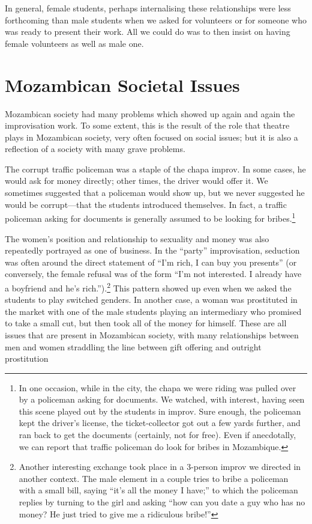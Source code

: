 \documentclass[article,twocolumn,twoside]{memoir}
\begin{document}
In general, female students, perhaps internalising these relationships were
less forthcoming than male students when we asked for volunteers or for someone
who was ready to present their work. All we could do was to then insist on
having female volunteers as well as male one.

\section{Mozambican Societal Issues}

Mozambican society had many problems which showed up again and again the
improvisation work. To some extent, this is the result of the role that theatre
plays in Mozambican society, very often focused on social issues; but it is
also a reflection of a society with many grave problems.

The corrupt traffic policeman was a staple of the chapa improv. In some cases,
he would ask for money directly; other times, the driver would offer it. We
sometimes suggested that a policeman would show up, but we never suggested he
would be corrupt---that the students introduced themselves. In fact, a traffic
policeman asking for documents is generally assumed to be looking for
bribes.\footnote{In one occasion, while in the city, the chapa we were riding
was pulled over by a policeman asking for documents. We watched, with interest,
having seen this scene played out by the students in improv. Sure enough, the
policeman kept the driver's license, the ticket-collector got out a few yards
further, and ran back to get the documents (certainly, not for free). Even if
anecdotally, we can report that traffic policeman do look for bribes in
Mozambique.}

The women's position and relationship to sexuality and money was also
repeatedly portrayed as one of business. In the ``party'' improvisation,
seduction was often around the direct statement of ``I'm rich, I can buy you
presents'' (or conversely, the female refusal was of the form ``I'm not
interested. I already have a boyfriend and he's rich.'').\footnote{Another
interesting exchange took place in a 3-person improv we directed in another
context. The male element in a couple tries to bribe a policeman with a small
bill, saying ``it's all the money I have;'' to which the policeman replies by
turning to the girl and asking ``how can you date a guy who has no money? He
just tried to give me a ridiculous bribe!''} This pattern showed up even when
we asked the students to play switched genders. In another case, a woman was
prostituted in the market with one of the male students playing an intermediary
who promised to take a small cut, but then took all of the money for himself.
These are all issues that are present in Mozambican society, with many
relationships between men and women straddling the line between gift offering
and outright prostitution
\end{document}
